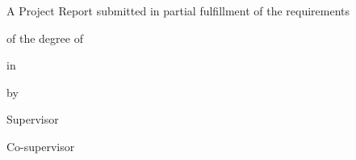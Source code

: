 \clearpage\thispagestyle{empty}
\begingroup\setlength{\parskip}{0pt}\setlength{\parindent}{0pt}
\centering\singlespacing
{\fontsize{22}{27}\selectfont\bfseries\ProjectTitle\par}
\vspace{10mm}
A Project Report submitted in partial fulfillment of the requirements\par
\vspace{4mm}of the degree of\par\vspace{4mm}
{\bfseries\DegreeName\par}in\par{\bfseries\ProgramName\par}
\vspace{7mm}by\par\vspace{3mm}
{\fontsize{15}{19}\selectfont\StudentTitleRows\par}
\vspace{8mm}Supervisor\par{\bfseries\GuideName\par}
\ifcoguide\vspace{3mm}Co-supervisor\par{\bfseries\CoGuideName\par}\fi
\vfill\InstituteLogo\par\vspace{5mm}
\DepartmentName\par\vspace{2mm}
{\bfseries\InstituteName\par}\InstitutePlace\par
\UniversityName\par\vspace{3mm}\SubmissionYear\par
\endgroup\clearpage
